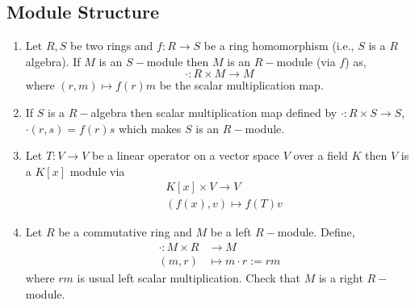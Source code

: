 \documentclass[11pt]{amsart}
\begin{document}
\subsection{Module Structure}
\begin{enumerate}
\item Let $R,S$ be two rings and $f:R\to S$ be a ring homomorphism (i.e., $S$ is a $R$ algebra). If $M$ is an $S-$module then $M$ is an $R-$module (via $f$) as, $$\cdot: R\times M\to M$$ where $(r,m)\mapsto f(r)m$ be the scalar multiplication map.
\item If $S$ is a $R-$algebra then scalar multiplication map defined by $\cdot: R\times S\to S$, $\cdot (r,s)=f(r)s$ which makes $S$ is an $R-$module.
\item Let $T:V\to V$ be a linear operator on a vector space $V$ over a field $K$ then $V$ is a $K[x]$ module via \begin{align*}
&K[x]\times V\to V\\
&(f(x),v)\mapsto f(T)v
\end{align*}
\item Let $R$ be a commutative ring and $M$ be a left $R-$module. Define, \begin{align*}
\cdot:M\times R&\to M\\
(m,r)&\mapsto m\cdot r:=rm
\end{align*} where $rm$ is usual left scalar multiplication.
Check that $M$ is a right $R-$module.
\end{enumerate}
\end{document}
